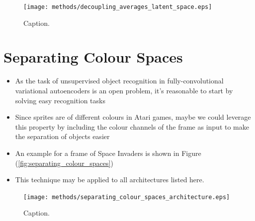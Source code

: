 \begin{figure}[H]
\centering
\captionsetup{justification=centering}
\texttt{[image: methods/decoupling\_averages\_latent\_space.eps]}
\caption{Caption.}
\label{fig:decoupling_averages_latent_space}
\end{figure}


%
%
%
%
%
\section{Separating Colour Spaces}

\begin{itemize}
\item As the task of unsupervised object recognition in fully-convolutional variational autoencoders is an open problem, it's reasonable to start by solving easy recognition tasks
\item Since sprites are of different colours in Atari games, maybe we could leverage this property by including the colour channels of the frame as input to make the separation of objects easier
\item An example for a frame of Space Invaders is shown in Figure (\ref{fig:separating_colour_spaces})
\item This technique may be applied to all architectures listed here.
\end{itemize}

\begin{figure}[h!]
\centering
\captionsetup{justification=centering}
\texttt{[image: methods/separating\_colour\_spaces\_architecture.eps]}
\caption{Caption.}
\label{fig:separating_colour_spaces_architecture}
\end{figure}

